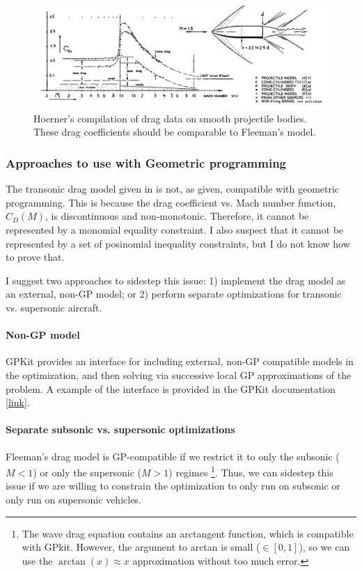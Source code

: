 \documentclass[12pt]{article}
\begin{document}
\begin{figure}[hbt!]
    \centering
    \includegraphics[width=1\textwidth]{figures/hoerner_fig_16_30}
    \caption{\label{fig:hoerner_fig_16_30} Hoerner's compilation of drag data on smooth projectile bodies. These drag coefficients should be comparable to Fleeman's model.}
\end{figure}


\subsubsection{Approaches to use with Geometric programming}
The transonic drag model given in \cite{Fleeman2012} is not, as given, compatible with geometric programming. This is because the drag coefficient vs. Mach number function, $C_D(M)$, is discontinuous and non-monotonic. Therefore, it cannot be represented by a monomial equality constraint. I also suspect that it cannot be represented by a set of posinomial inequality constraints, but I do not know how to prove that.

I suggest two approaches to sidestep this issue: 1) implement the drag model as an external, non-GP model; or 2) perform separate optimizations for transonic vs. supersonic aircraft.

\paragraph{Non-GP model}
GPKit provides an interface for including external, non-GP compatible models in the optimization, and then solving via successive local GP approximations of the problem.
A example of the interface is provided in the GPKit documentation [\href{https://gpkit.readthedocs.io/en/latest/signomialprogramming.html#sequential-geometric-programs}{link}].

\paragraph{Separate subsonic vs. supersonic optimizations}
Fleeman's drag model is GP-compatible if we restrict it to only the subsonic ($M<1$) or only the supersonic ($M > 1$) regimes \footnote{The wave drag equation contains an arctangent function, which is compatible with GPkit. However, the argument to arctan is small ($\in [0, 1]$), so we can use the $\arctan(x) \approx x$ approximation without too much error.}. Thus, we can sidestep this issue if we are willing to constrain the optimization to only run on subsonic or only run on supersonic vehicles.
\end{document}
